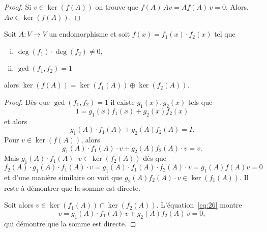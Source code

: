 \begin{proof}
Si $v ∈ \ker(f(A))$ on trouve que $f(A)\,Av = Af(A)\,v = 0$. Alors, $Av ∈ \ker(f(A))$. 
\end{proof}


\begin{theorem}
  \label{thr:37}
  Soit $A: V \rightarrow V$ un endomorphisme et soit $f(x) = f_1(x) \cdot f_2(x)$ tel que
  \begin{enumerate}[i)]
  \item $\deg(f_1) \cdot \deg(f_2) \neq 0$,
  \item $\gcd(f_1,f_2) = 1$ 
  \end{enumerate}
  alors 
  $
      \ker(f(A)) = \ker(f_1(A)) \oplus \ker(f_2(A)) 
   $.   
\end{theorem}
\begin{proof}
  Dès que $\gcd(f_1,f_2)=1$ il existe $g_1(x),g_2(x)$ tels que 
  \begin{displaymath}
    1 = g_1(x) f_1(x) + g_2(x) f_2(x)
  \end{displaymath}
  et alors 
  \begin{equation}
    \label{eq:26}   
    g_1(A) \cdot f_1(A) +  g_2(A) f_2(A) = I. 
  \end{equation}
  Pour $v \in \ker(f(A))$, alors 
\begin{displaymath}
   g_1(A) \cdot f_1(A) \cdot v  + g_2(A) f_2(A) \cdot v  = v. 
\end{displaymath}
Mais $g_1(A) \cdot f_1(A) \cdot v \in \ker(f_2(A))$  dès que 
\begin{displaymath}
  f_2(A) \cdot g_1(A) \cdot f_1(A) \cdot v =   g_1(A) \cdot f_1(A) ⋅ f_2(A) \cdot v = g_1(A) f(A) v = 0
\end{displaymath}
et d'une manière similaire on voit que $g_2(A) f_2(A) \cdot v \in \ker(f_1(A))$. Il reste à démontrer que la somme est directe. 

Soit alors $v ∈  \ker(f_1(A))  ∩  \ker(f_2(A))$.  L'équation~\eqref{eq:26} montre 
\begin{displaymath}
  v =  g_1(A) \cdot f_1(A) \, v+  g_2(A) f_2(A) \, v = 0,
\end{displaymath}
qui démontre que la somme est directe. 
\end{proof}



